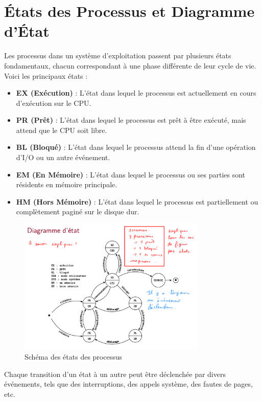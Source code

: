 \section*{États des Processus et Diagramme d'État}

Les processus dans un système d'exploitation passent par plusieurs états fondamentaux, chacun correspondant à une phase différente de leur cycle de vie. Voici les principaux états :

\begin{itemize}
    \item \textbf{EX (Exécution)} : L'état dans lequel le processus est actuellement en cours d'exécution sur le CPU.
    \item \textbf{PR (Prêt)} : L'état dans lequel le processus est prêt à être exécuté, mais attend que le CPU soit libre.
    \item \textbf{BL (Bloqué)} : L'état dans lequel le processus attend la fin d'une opération d'I/O ou un autre événement.
    \item \textbf{EM (En Mémoire)} : L'état dans lequel le processus ou ses parties sont résidents en mémoire principale.
    \item \textbf{HM (Hors Mémoire)} : L'état dans lequel le processus est partiellement ou complètement paginé sur le disque dur.
\end{itemize}

\begin{figure}[h]
    \centering
    \includegraphics[width=0.8\textwidth]{Images/Diagrams/schema.png}
    \caption{Schéma des états des processus}
\end{figure}

Chaque transition d'un état à un autre peut être déclenchée par divers événements, tels que des interruptions, des appels système, des fautes de pages, etc.


